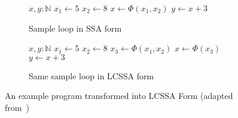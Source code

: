 \begin{figure}[h]
    \begin{subfigure}[b]{0.5\textwidth}
        \centering
        \begin{algorithmic}
            \State $x, y: \mathbb{N}$
            \Repeat
            \State $x_1 \gets 5$
            \Else
            \State $x_2 \gets 8$
            \EndIf
            \State $x \gets \Phi(x_1, x_2)$
            \State $y \gets x + 3$
            \EndFunction
        \end{algorithmic}
        \subfigfill
        \caption{Sample loop in SSA form}
    \end{subfigure}
    \begin{subfigure}[b]{0.5\textwidth}
        \centering
        \begin{algorithmic}
            \State $x, y: \mathbb{N}$
            \Repeat
            \State $x_1 \gets 5$
            \Else
            \State $x_2 \gets 8$
            \EndIf
            \State $x_3 \gets \Phi(x_1, x_2)$
            \State $x \gets \Phi(x_3)$
            \State $y \gets x + 3$
            \EndFunction
        \end{algorithmic}
        \subfigfill
        \caption{Same sample loop in LCSSA form}
    \end{subfigure}
    \caption{An example program transformed into LCSSA Form (adapted from~\cite{LLVM_LCSSA})}
    \label{fig:basics:LCSSA}
\end{figure}

